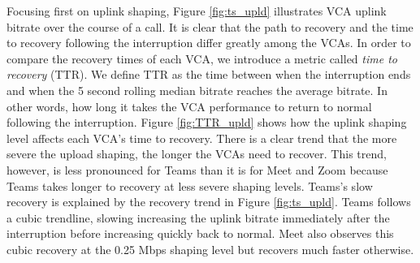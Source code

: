 Focusing first on uplink shaping, Figure \ref{fig:ts_upld} illustrates VCA uplink bitrate over the course of a call. It is clear that the path to recovery and the time to recovery following the interruption differ greatly among the VCAs. In order to compare the recovery times of each VCA, we introduce a metric called \textit{time to recovery} (TTR). We define TTR as the time between when the interruption ends and when the 5 second rolling median bitrate reaches the average bitrate. In other words, how long it takes the VCA performance to return to normal following the interruption. Figure \ref{fig:TTR_upld} shows how the uplink shaping level affects each VCA's time to recovery. There is a clear trend that the more severe the upload shaping, the longer the VCAs need to recover. This trend, however, is less pronounced for Teams than it is for Meet and Zoom because Teams takes longer to recovery at less severe shaping levels. Teams's slow recovery is explained by the recovery trend in Figure \ref{fig:ts_upld}. Teams follows a cubic trendline, slowing increasing the uplink bitrate immediately after the interruption before increasing quickly back to normal. Meet also observes this cubic recovery at the 0.25 Mbps shaping level but recovers much faster otherwise. 

